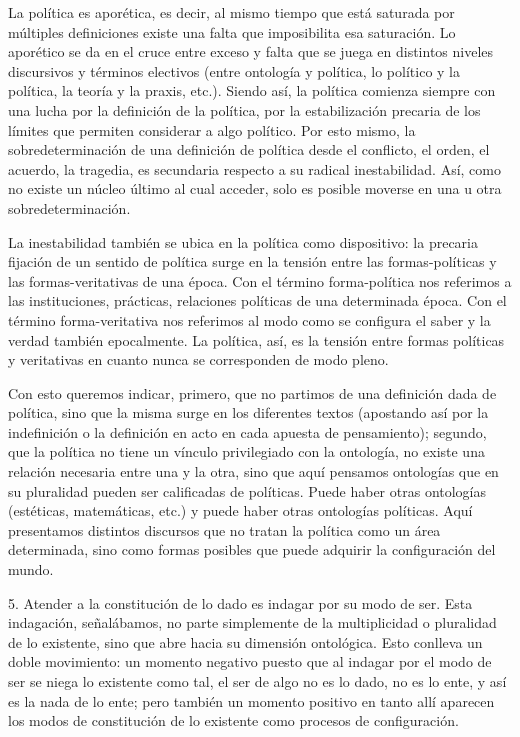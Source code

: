 \documentclass{book}
\begin{document}
La política es aporética, es decir, al mismo tiempo que está saturada
por múltiples definiciones existe una falta que imposibilita esa
saturación. Lo aporético se da en el cruce entre exceso y falta que se
juega en distintos niveles discursivos y términos electivos (entre
ontología y política, lo político y la política, la teoría y la praxis,
etc.). Siendo así, la política comienza siempre con una lucha por la
definición de la política, por la estabilización precaria de los límites
que permiten considerar a algo político. Por esto mismo, la
sobredeterminación de una definición de política desde el conflicto, el
orden, el acuerdo, la tragedia, es secundaria respecto a su radical
inestabilidad. Así, como no existe un núcleo último al cual acceder,
solo es posible moverse en una u otra sobredeterminación.

La inestabilidad también se ubica en la política como dispositivo: la
precaria fijación de un sentido de política surge en la tensión entre
las formas-políticas y las formas-veritativas de una época. Con el
término forma-política nos referimos a las instituciones, prácticas,
relaciones políticas de una determinada época. Con el término
forma-veritativa nos referimos al modo como se configura el saber y la
verdad también epocalmente. La política, así, es la tensión entre formas
políticas y veritativas en cuanto nunca se corresponden de modo pleno.

Con esto queremos indicar, primero, que no partimos de una definición
dada de política, sino que la misma surge en los diferentes textos
(apostando así por la indefinición o la definición en acto en cada
apuesta de pensamiento); segundo, que la política no tiene un vínculo
privilegiado con la ontología, no existe una relación necesaria entre
una y la otra, sino que aquí pensamos ontologías que en su pluralidad
pueden ser calificadas de políticas. Puede haber otras ontologías
(estéticas, matemáticas, etc.) y puede haber otras ontologías políticas.
Aquí presentamos distintos discursos que no tratan la política como un
área determinada, sino como formas posibles que puede adquirir la
configuración del mundo.

5. Atender a la constitución de lo dado es indagar por su modo de ser. Esta
indagación, señalábamos, no parte simplemente de la multiplicidad o
pluralidad de lo existente, sino que abre hacia su dimensión ontológica.
Esto conlleva un doble movimiento: un momento negativo puesto que al
indagar por el modo de ser se niega lo existente como tal, el ser de
algo no es lo dado, no es lo ente, y así es la nada de lo ente; pero
también un momento positivo en tanto allí aparecen los modos de
constitución de lo existente como procesos de configuración.
\end{document}
